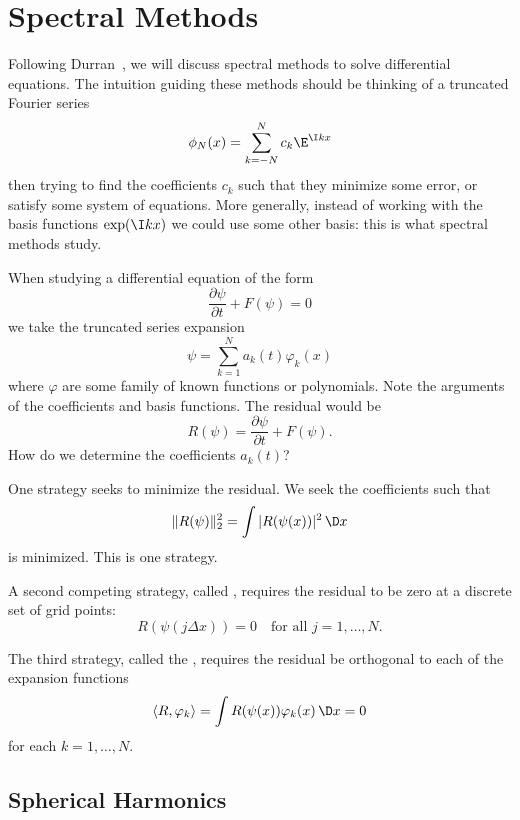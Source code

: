 \chapter{Spectral Methods}

Following Durran~\cite{durran2010numerical}, we will discuss spectral
methods to solve differential equations. The intuition guiding these
methods should be thinking of a truncated Fourier series
\begin{equation}
  \phi_{N}(x) = \sum^{N}_{k=-N}c_{k}\E^{\I kx}
\end{equation}
then trying to find the coefficients $c_{k}$ such that they minimize
some error, or satisfy some system of equations. More generally, instead
of working with the basis functions $\exp(\I kx)$ we could use some
other basis: this is what spectral methods study.

When studying a differential equation of the form
\begin{equation}
\frac{\partial\psi}{\partial t} + F(\psi) = 0
\end{equation}
we take the truncated series expansion
\begin{equation}
  \psi = \sum^{N}_{k=1}a_{k}(t)\varphi_{k}(x)
\end{equation}
where $\varphi$ are some family of known functions or polynomials. Note
the arguments of the coefficients and basis functions. The
residual would be
\begin{equation}
  R(\psi) = \frac{\partial\psi}{\partial t} + F(\psi).
\end{equation}
How do we determine the coefficients $a_{k}(t)$?

One strategy seeks to minimize the residual.
We seek the coefficients such that
\begin{equation}
  \|R(\psi)\|_{2}^{2} = \int|R(\psi(x))|^{2}\,\D x
\end{equation}
is minimized. This is one strategy.

A second competing strategy, called , requires the
residual to be zero at a discrete set of grid points:
\begin{equation}
  R(\psi(j\Delta x)) = 0\quad\mbox{for all }j=1,\dots,N.
\end{equation}

The third strategy, called the ,
requires the residual be orthogonal to each of the expansion functions
\begin{equation}
  \langle R, \varphi_{k}\rangle = \int R(\psi(x))\varphi_{k}(x)\,\D x = 0
\end{equation}
for each $k=1,\dots, N$.

\section{Spherical Harmonics}
